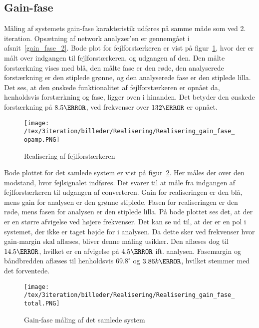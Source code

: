 
\subsection{Gain-fase}
Måling af systemets gain-fase karakteristik udføres på samme måde som ved 2. iteration. Opsætning af network analyzer'en er gennemgået i afsnit~\ref{gain_fase_2}. Bode plot for fejlforstærkeren er vist på figur~\ref{fig:Realisering_error_op_amp_3}, hvor der er målt over indgangen til fejlforstærkeren, og udgangen af den. Den målte forstærkning vises med blå, den målte fase er den røde, den analyserede forstærkning er den stiplede grønne, og den analyserede fase er den stiplede lilla. Det ses, at den ønskede funktionalitet af fejlforstærkeren er opnået da, henholdsvis forstærkning og fase, ligger oven i hinanden. Det betyder den ønskede forstærkning på $8.5\decibel$, ved frekvenser over $132\hertz$ er opnået. 

\begin{figure}[H]
	\center
	\texttt{[image: /tex/3iteration/billeder/Realisering/Realisering\_gain\_fase\_opamp.PNG]}
	\caption{Realisering af fejlforstærkeren}
	\label{fig:Realisering_error_op_amp_3}
\end{figure}

\noindent Bode plottet for det samlede system er vist på figur~\ref{fig:Realisering_total_3}. Her måles der over den modstand, hvor fejlsignalet indføres. Det svarer til at måle fra indgangen af fejlforstærkeren til udgangen af converteren. Gain for realiseringen er den blå, mens gain for analysen er den grønne stiplede. Fasen for realiseringen er den røde, mens fasen for analysen er den stiplede lilla. På bode plottet ses det, at der er en større afvigelse ved højere frekvenser. Det kan se ud til, at der er en pol i systemet, der ikke er taget højde for i analysen. Da dette sker ved frekvenser hvor gain-margin skal aflæses, bliver denne måling usikker. Den aflæses dog til $14.5\decibel$, hvilket er en afvigelse på $4.5\decibel$ ift. analysen. Fasemargin og båndbredden aflæses til henholdsvis $69.8^\circ$ og $3.86k\hertz$, hvilket stemmer med det forventede. 

\begin{figure}[H]
	\center
	\texttt{[image: /tex/3iteration/billeder/Realisering/Realisering\_gain\_fase\_total.PNG]}
	\caption{Gain-fase måling af det samlede system}
	\label{fig:Realisering_total_3}
\end{figure}

